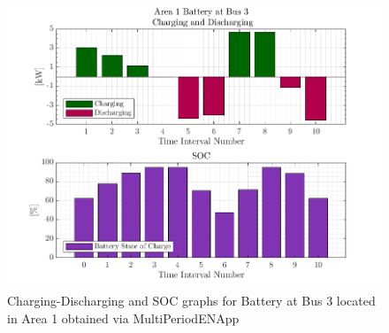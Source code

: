 \documentclass[../../outputs/main.tex]{subfiles}
\begin{document}
\begin{figure}[h!]
    \centering
    \includegraphics[width=\linewidth]{../figures/T10-pv20-batt30-genCost/dopf/BatteryPlots/macroItr_5_genCost_Battery_1_alpha_0.001.png}
    \caption{Charging-Discharging and SOC graphs for Battery at Bus 3 located in Area 1 obtained via MultiPeriodENApp}
    \label{fig:batt-plot-dopf-10-20-30-genCost}
\end{figure}
    

\lipsum[1]
\end{document}
